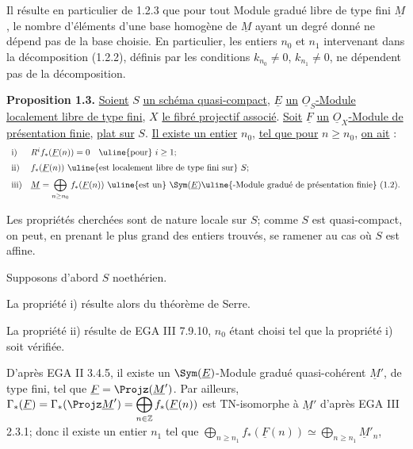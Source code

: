 
Il
résulte en particulier de 1.2.3 que pour tout Module gradué libre de type fini \(\underline{M}\), le nombre d'éléments d'une base homogène de \(\underline{M}\) ayant un degré donné ne dépend pas de la base choisie. En particulier, les entiers \(n_0\) et \(n_1\) intervenant dans la décomposition (1.2.2), définis par les conditions \(k_{n_0}\neq0\), \(k_{n_1}\neq0\), ne dépendent pas de la décomposition.

\textbf{Proposition 1.3.} \uline{Soient} \(S\) \uline{un schéma quasi-compact}, \(\underline{E}\) \uline{un} \(\underline{O}_S\)\uline{-Module localement libre de type fini}, \(X\) \uline{le fibré projectif associé}. \uline{Soit} \(\underline{F}\) \uline{un} \(\underline{O}_X\)\uline{-Module de présentation finie}, \uline{plat sur} \(S\). \uline{Il existe un entier} \(n_0\), \uline{tel que pour} \(n\geq n_0\), \uline{on ait} :
\[
\begin{array}{ll}
\text{i)}& R^i f_*(\underline{F}(n))=0\quad\text{\uline{pour} }i\geq 1;\\[2mm]
\text{ii)}& f_*(\underline{F}(n))\text{ \uline{est localement libre de type fini sur} }S;\\[2mm]
\text{iii)}& \underline{M}=\displaystyle\bigoplus_{n\geq n_0} f_*(\underline{F}(n))\text{ \uline{est un} }\Sym(\underline{E})\text{\uline{-Module gradué de présentation finie} (1.2).}
\end{array}
\]

Les propriétés cherchées sont de nature locale sur \(S\); comme \(S\) est quasi-compact, on peut, en prenant le plus grand des entiers trouvés, se ramener au cas où \(S\) est affine.

Supposons d'abord \(S\) noethérien.

La propriété i) résulte alors du théorème de Serre.

La propriété ii) résulte de EGA III 7.9.10, \(n_0\) étant choisi tel que la propriété i) soit vérifiée.

D'après EGA II 3.4.5, il existe un \(\Sym(\underline{E})\)-Module gradué quasi-cohérent \(\underline{M}'\), de type fini, tel que \(\underline{F}=\Projz(\underline{M}')\). Par ailleurs, \(\Gamma_*(\underline{F})=\Gamma_*(\Projz \underline{M}')=\displaystyle\bigoplus_{n\in\mathbb Z} f_*(\underline{F}(n))\) est TN-isomorphe à \(\underline{M}'\) d'après EGA III 2.3.1; donc il existe un entier \(n_1\) tel que \(\displaystyle\bigoplus_{n\geq n_1} f_*(\underline{F}(n))\simeq \bigoplus_{n\geq n_1} \underline{M}'_n\),
